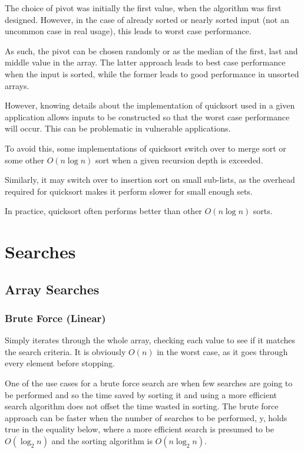 \documentclass[]{article}
\begin{document}
The choice of pivot was initially the first value, when the algorithm was first designed. However, in the case of already sorted or nearly sorted input (not an uncommon case in real usage), this leads to worst case performance.

As such, the pivot can be chosen randomly or as the median of the first, last and middle value in the array. The latter approach leads to best case performance when the input is sorted, while the former leads to good performance in unsorted arrays.

However, knowing details about the implementation of quicksort used in a given application allows inputs to be constructed so that the worst case performance will occur. This can be problematic in vulnerable applications.

To avoid this, some implementations of quicksort switch over to merge sort or some other $O(n\log{n})$ sort when a given recursion depth is exceeded.

Similarly, it may switch over to insertion sort on small sub-lists, as the overhead required for quicksort makes it perform slower for small enough sets.

In practice, quicksort often performs better than other $O(n\log{n})$ sorts.

\pagebreak

\section{Searches}

\subsection{Array Searches}

\subsubsection{Brute Force (Linear)}

Simply iterates through the whole array, checking each value to see if it matches the search criteria. It is obviously $O(n)$ in the worst case, as it goes through every element before stopping.

One of the use cases for a brute force search are when few searches are going to be performed and so the time saved by sorting it and using a more efficient search algorithm does not offset the time wasted in sorting. The brute force approach can be faster when the number of searches to be performed, y, holds true in the equality below, where a more efficient search is presumed to be $O(\log_{2}{n})$ and the sorting algorithm is $O(n\log_{2}{n})$.
\end{document}
